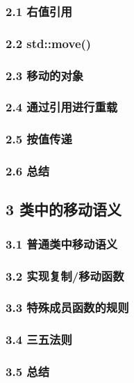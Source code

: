 \documentclass[11pt,a4paper,UTF8]{ctexart}
\begin{document}
		\subsubsection{2.1 右值引用}
		
		\subsubsection{2.2 std::move()}
		
		\subsubsection{2.3 移动的对象}
		
		\subsubsection{2.4 通过引用进行重载}
		
		\subsubsection{2.5 按值传递}
		
		\subsubsection{2.6 总结}
		
	\subsection{3 类中的移动语义}
	
		\subsubsection{3.1 普通类中移动语义}
		
		\subsubsection{3.2 实现复制/移动函数}
		
		\subsubsection{3.3 特殊成员函数的规则}
		
		\subsubsection{3.4 三五法则}
		
		\subsubsection{3.5 总结}
		
\end{document}
